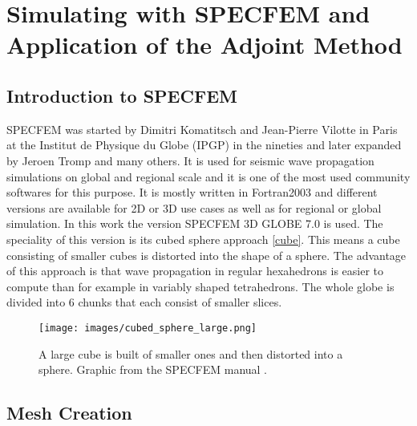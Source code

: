 

\section{Simulating with SPECFEM and Application of the Adjoint Method}

\subsection{Introduction to SPECFEM}

SPECFEM was started by Dimitri Komatitsch and Jean-Pierre Vilotte in Paris at the 
Institut de Physique du Globe (IPGP) \citep{Vilotte1998} in the nineties and later expanded by Jeroen Tromp and many others. 
It is used for seismic wave propagation simulations on global and regional scale and it is one of the 
most used community softwares for this purpose. 
It is mostly written in Fortran2003 and different versions are available for 2D or 3D use cases as well
as for regional or global simulation. 
In this work the version SPECFEM 3D GLOBE 7.0 is used.
The speciality of this version is its cubed sphere approach \autoref{cube}.
This means a cube consisting of smaller cubes is distorted into the shape of a sphere.
The advantage of this approach is that wave propagation in regular hexahedrons is easier to compute than
for example in variably shaped tetrahedrons. %
The whole globe is divided into 6 chunks that each consist of smaller slices.



\begin{figure}[h]
\begin{center}
\texttt{[image: images/cubed\_sphere\_large.png]}
\caption{A large cube is built of smaller ones and then distorted into a sphere.
Graphic from the SPECFEM manual \citep{specfem_manual}.}
\label{cube}
\end{center}
\end{figure}


\subsection{Mesh Creation}

